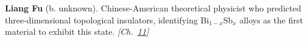 \textbf{Liang Fu} (b. unknown). Chinese-American theoretical physicist who predicted three-dimensional topological insulators, identifying Bi$_{1-x}$Sb$_x$ alloys as the first material to exhibit this state. \emph{[Ch.~\hyperref[ch:topologicalinsulators]{11}]}

